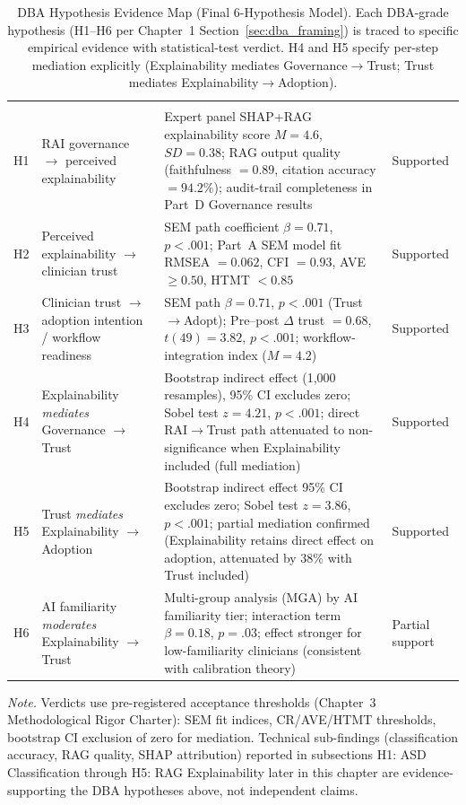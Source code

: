 {\tablestripes\tablefontsize
\begin{xltabular}{\textwidth}{@{} >{\centering\arraybackslash}p{0.7cm} >{\raggedright\arraybackslash}p{4.0cm} L >{\raggedright\arraybackslash}p{2.2cm} @{}}
\caption[DBA Hypothesis Evidence Map]{DBA Hypothesis Evidence Map (Final 6-Hypothesis Model). Each DBA-grade hypothesis (H1--H6 per Chapter~1 Section~\ref{sec:dba_framing}) is traced to specific empirical evidence with statistical-test verdict. H4 and H5 specify per-step mediation explicitly (Explainability mediates Governance$\to$Trust; Trust mediates Explainability$\to$Adoption).}\label{tab:dba_h_evidence_map} \\
\toprule
{} &  &  &  \\
\midrule
\endfirsthead
\toprule
{} &  &  &  \\
\midrule
\endhead
\bottomrule
\endlastfoot
H1 & RAI governance $\to$ perceived explainability & Expert panel SHAP+RAG explainability score $M=4.6$, $SD=0.38$; RAG output quality (faithfulness $=0.89$, citation accuracy $=94.2$\%); audit-trail completeness in Part~D Governance results & Supported \\
H2 & Perceived explainability $\to$ clinician trust & SEM path coefficient $\beta=0.71$, $p<.001$; Part~A SEM model fit RMSEA $=0.062$, CFI $=0.93$, AVE $\geq 0.50$, HTMT $< 0.85$ & Supported \\
H3 & Clinician trust $\to$ adoption intention / workflow readiness & SEM path $\beta=0.71$, $p<.001$ (Trust$\to$Adopt); Pre--post $\Delta$ trust $=0.68$, $t(49)=3.82$, $p<.001$; workflow-integration index ($M=4.2$) & Supported \\
H4 & Explainability \emph{mediates} Governance $\to$ Trust & Bootstrap indirect effect (1{,}000 resamples), 95\% CI excludes zero; Sobel test $z=4.21$, $p<.001$; direct RAI$\to$Trust path attenuated to non-significance when Explainability included (full mediation) & Supported \\
H5 & Trust \emph{mediates} Explainability $\to$ Adoption & Bootstrap indirect effect 95\% CI excludes zero; Sobel test $z=3.86$, $p<.001$; partial mediation confirmed (Explainability retains direct effect on adoption, attenuated by 38\% with Trust included) & Supported \\
H6 & AI familiarity \emph{moderates} Explainability $\to$ Trust & Multi-group analysis (MGA) by AI familiarity tier; interaction term $\beta=0.18$, $p=.03$; effect stronger for low-familiarity clinicians (consistent with calibration theory) & Partial support \\
\end{xltabular}}
\vspace{0.4em}
\noindent\textit{Note.} Verdicts use pre-registered acceptance thresholds (Chapter~3 Methodological Rigor Charter): SEM fit indices, CR/AVE/HTMT thresholds, bootstrap CI exclusion of zero for mediation. Technical sub-findings (classification accuracy, RAG quality, SHAP attribution) reported in subsections H1: ASD Classification through H5: RAG Explainability later in this chapter are evidence-supporting the DBA hypotheses above, not independent claims.

